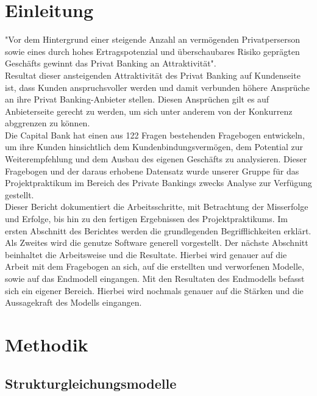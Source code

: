 \documentclass{article}\usepackage[]{graphicx}\usepackage[]{color}
\begin{document}
\section{Einleitung}%
"Vor dem Hintergrund einer steigende Anzahl an vermögenden Privatperserson sowie eines durch hohes Ertragspotenzial und überschaubares Risiko geprägten Geschäfts gewinnt das Privat Banking an Attraktivität".\cite{seiler2009kundenzufriedenheit} \\Resultat dieser ansteigenden Attraktivität des Privat Banking auf Kundenseite ist, dass Kunden anspruchsvoller werden und damit verbunden höhere Ansprüche an ihre Privat Banking-Anbieter stellen.\cite{seiler2009kundenzufriedenheit}
Diesen Ansprüchen gilt es auf Anbieterseite gerecht zu werden, um sich unter anderem von der Konkurrenz abggrenzen zu können.\\
Die Capital Bank hat einen aus 122 Fragen bestehenden Fragebogen entwickeln, um ihre Kunden hinsichtlich dem Kundenbindungsvermögen, dem Potential zur Weiterempfehlung und dem Ausbau des eigenen Geschäfts zu analysieren.
Dieser Fragebogen und der daraus erhobene Datensatz wurde unserer Gruppe für das Projektpraktikum im Bereich des Private Bankings zwecks Analyse zur Verfügung gestellt. \\
Dieser Bericht dokumentiert die Arbeitsschritte, mit Betrachtung der Misserfolge und Erfolge, bis hin zu  den fertigen Ergebnissen des Projektpraktikums. Im ersten Abschnitt des Berichtes werden die grundlegenden Begrifflichkeiten erklärt. Als Zweites wird die genutze Software generell vorgestellt. Der nächste Abschnitt beinhaltet die Arbeitsweise und die Resultate. Hierbei wird genauer auf die Arbeit mit dem Fragebogen an sich, auf die erstellten und verworfenen Modelle, sowie auf das Endmodell eingangen. Mit den Resultaten des Endmodells befasst sich ein eigener Bereich. Hierbei wird nochmals genauer auf die Stärken und die Aussagekraft des Modells eingangen.



\section{Methodik}%

\subsection{Strukturgleichungsmodelle}
\end{document}
